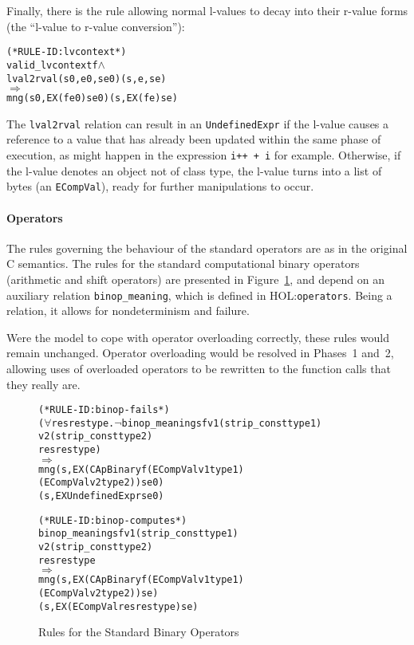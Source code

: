 \documentclass[11pt]{article}
\newcommand{\HOLfile}[1]{HOL:\texttt{#1}}
\begin{document}
%
%
Finally, there is the rule allowing normal l-values to decay into
their r-value forms (the ``l-value to r-value conversion''):
%
\begin{alltt}
(* RULE-ID: lvcontext *)
     valid_lvcontext f \(\land\)
     lval2rval (s0,e0,se0) (s,e,se)
   \(\Rightarrow\)
     mng (s0, EX (f e0) se0) (s, EX (f e) se)
\end{alltt}
The \texttt{lval2rval} relation can result in an
\texttt{UndefinedExpr} if the l-value causes a reference to a value
that has already been updated within the same phase of execution, as
might happen in the expression \texttt{i++ + i} for example.
Otherwise, if the l-value denotes an object not of class type, the
l-value turns into a list of bytes (an \texttt{ECompVal}), ready for
further manipulations to occur.

\paragraph{Operators} The rules governing the behaviour of the
standard operators are as in the original C semantics.  The rules for
the standard computational binary operators (arithmetic and shift
operators) are presented in Figure~\ref{fig:capbinary-rules}, and
depend on an auxiliary relation \texttt{binop_meaning}, which is
defined in \HOLfile{operators}.  Being a relation, it allows for
nondeterminism and failure.

Were the model to cope with operator overloading correctly, these
rules would remain unchanged.  Operator overloading would be resolved
in Phases~1 and~2, allowing uses of overloaded operators to be
rewritten to the function calls that they really are.
\begin{figure}[htbp]
%
%
%
\begin{alltt}
(* RULE-ID: binop-fails *)
     (\(\forall\)res restype. \(\neg\)binop_meaning s f \(\!\)v1 (strip_const type1)
                                       v2 (strip_const type2)
                                       res restype)
   \(\Rightarrow\)
     mng (s, EX (CApBinary f (ECompVal v1 type1)
                             (ECompVal v2 type2)) se0)
         (s, EX UndefinedExpr se0)
\end{alltt}

\begin{alltt}
(* RULE-ID: binop-computes *)
     binop_meaning s f v1 (strip_const type1)
                       v2 (strip_const type2)
                       res restype
   \(\Rightarrow\)
     mng (s, EX (CApBinary f (ECompVal v1 type1)
                             (ECompVal v2 type2)) se)
         (s, EX (ECompVal res restype) se)
\end{alltt}
\caption{Rules for the Standard Binary Operators}
\label{fig:capbinary-rules}
\end{figure}
\end{document}
